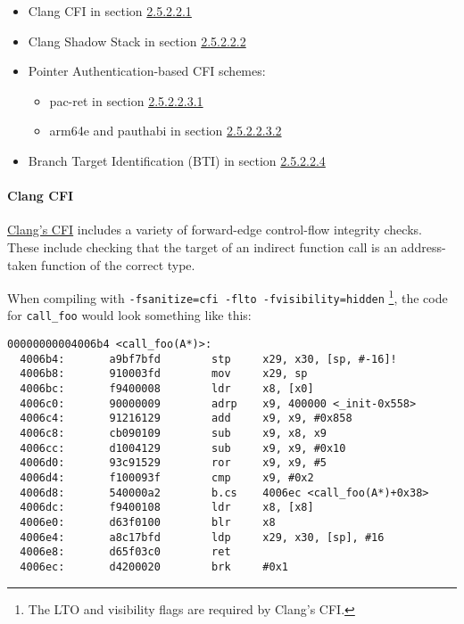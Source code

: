 \documentclass[
  a4paper,
]{report}
\providecommand{\tightlist}{%
  \setlength{\itemsep}{0pt}\setlength{\parskip}{0pt}}
\begin{document}
\begin{itemize}
\tightlist
\item
  Clang CFI in section \hyperref[sec:clang-cfi]{2.5.2.2.1}
\item
  Clang Shadow Stack in section
  \hyperref[sec:clang-shadow-stack]{2.5.2.2.2}
\item
  Pointer Authentication-based CFI schemes:

  \begin{itemize}
  \tightlist
  \item
    pac-ret in section \hyperref[sec:pac-ret]{2.5.2.2.3.1}
  \item
    arm64e and pauthabi in section
    \hyperref[sec:arm64e-pauthabi]{2.5.2.2.3.2}
  \end{itemize}
\item
  Branch Target Identification (BTI) in section
  \hyperref[sec:bti]{2.5.2.2.4}
\end{itemize}

\paragraph{Clang CFI}\label{sec:clang-cfi}

\href{https://clang.llvm.org/docs/ControlFlowIntegrity.html}{Clang's
CFI} includes a variety of forward-edge control-flow integrity checks.
These include checking that the target of an indirect function call is
an address-taken function of the correct type.

When compiling with \texttt{-fsanitize=cfi\ -flto\ -fvisibility=hidden}
\footnote{The LTO and visibility flags are required by Clang's CFI.},
the code for \texttt{call\_foo} would look something like this:

\begin{verbatim}
00000000004006b4 <call_foo(A*)>:
  4006b4:       a9bf7bfd        stp     x29, x30, [sp, #-16]!
  4006b8:       910003fd        mov     x29, sp
  4006bc:       f9400008        ldr     x8, [x0]
  4006c0:       90000009        adrp    x9, 400000 <_init-0x558>
  4006c4:       91216129        add     x9, x9, #0x858
  4006c8:       cb090109        sub     x9, x8, x9
  4006cc:       d1004129        sub     x9, x9, #0x10
  4006d0:       93c91529        ror     x9, x9, #5
  4006d4:       f100093f        cmp     x9, #0x2
  4006d8:       540000a2        b.cs    4006ec <call_foo(A*)+0x38>
  4006dc:       f9400108        ldr     x8, [x8]
  4006e0:       d63f0100        blr     x8
  4006e4:       a8c17bfd        ldp     x29, x30, [sp], #16
  4006e8:       d65f03c0        ret
  4006ec:       d4200020        brk     #0x1
\end{verbatim}
\end{document}
